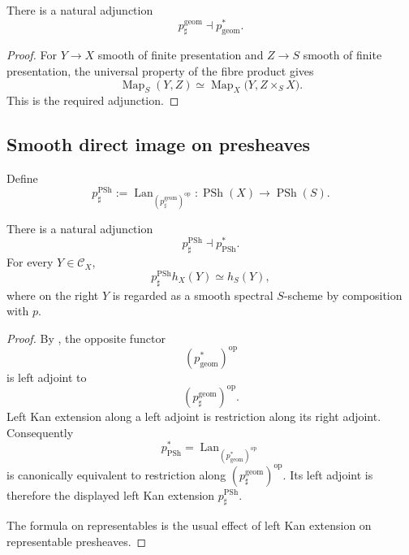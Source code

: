 \begin{proposition}
\label{prop:geometric-smooth-adjunction}
There is a natural adjunction
\[
    p^{\mathrm{geom}}_\sharp
    \dashv
    p^*_{\mathrm{geom}}.
\]
\end{proposition}

\begin{proof}
For \(Y\to X\) smooth of finite presentation and
\(Z\to S\) smooth of finite presentation, the universal property of the
fibre product gives
\[
    \operatorname{Map}_S(Y,Z)
    \simeq
    \operatorname{Map}_X
    \bigl(
        Y,
        Z\times_SX
    \bigr).
\]
This is the required adjunction.
\end{proof}

\subsection{Smooth direct image on presheaves}

\begin{construction}
\label{con:presheaf-smooth-direct-image}
Define
\[
    p^{\operatorname{PSh}}_\sharp
    :=
    \operatorname{Lan}_{(p^{\mathrm{geom}}_\sharp)^{\mathrm{op}}}
    \colon
    \operatorname{PSh}(X)
    \longrightarrow
    \operatorname{PSh}(S).
\]
\end{construction}

\begin{proposition}
\label{prop:presheaf-smooth-adjunction}
There is a natural adjunction
\[
    p^{\operatorname{PSh}}_\sharp
    \dashv
    p^*_{\operatorname{PSh}}.
\]
For every \(Y\in\mathcal C_X\),
\[
    p^{\operatorname{PSh}}_\sharp h_X(Y)
    \simeq
    h_S(Y),
\]
where on the right \(Y\) is regarded as a smooth spectral \(S\)-scheme
by composition with \(p\).
\end{proposition}

\begin{proof}
By
,
the opposite functor
\[
    (p^*_{\mathrm{geom}})^{\mathrm{op}}
\]
is left adjoint to
\[
    (p^{\mathrm{geom}}_\sharp)^{\mathrm{op}}.
\]
Left Kan extension along a left adjoint is restriction along its right
adjoint.  Consequently
\[
    p^*_{\operatorname{PSh}}
    =
    \operatorname{Lan}_{(p^*_{\mathrm{geom}})^{\mathrm{op}}}
\]
is canonically equivalent to restriction along
\((p^{\mathrm{geom}}_\sharp)^{\mathrm{op}}\).  Its left adjoint is
therefore the displayed left Kan extension
\(p^{\operatorname{PSh}}_\sharp\).

The formula on representables is the usual effect of left Kan
extension on representable presheaves.
\end{proof}


